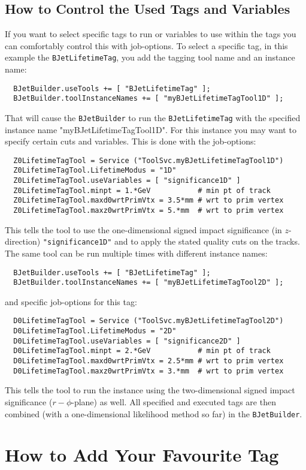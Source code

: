 \documentclass[a4paper,12pt]{article}
\begin{document}
\begin{appendix}
\subsection{How to Control the Used Tags and Variables}
If you want to select specific tags to run or variables to use within
the tags you can comfortably control this with job-options.
To select a specific tag, in this example the {\tt BJetLifetimeTag}, you 
add the tagging tool name and an instance name:
\begin{verbatim}
  BJetBuilder.useTools += [ "BJetLifetimeTag" ];
  BJetBuilder.toolInstanceNames += [ "myBJetLifetimeTagTool1D" ];
\end{verbatim}
That will cause the {\tt BJetBuilder} to run the {\tt BJetLifetimeTag} with
the specified instance name "myBJetLifetimeTagTool1D". For this instance you
may want to specify certain cuts and variables. This is done with the 
job-options:
\begin{verbatim}
  Z0LifetimeTagTool = Service ("ToolSvc.myBJetLifetimeTagTool1D")
  Z0LifetimeTagTool.LifetimeModus = "1D"
  Z0LifetimeTagTool.useVariables = [ "significance1D" ]
  Z0LifetimeTagTool.minpt = 1.*GeV           # min pt of track
  Z0LifetimeTagTool.maxd0wrtPrimVtx = 3.5*mm # wrt to prim vertex
  Z0LifetimeTagTool.maxz0wrtPrimVtx = 5.*mm  # wrt to prim vertex
\end{verbatim}
This tells the tool to use the one-dimensional signed impact significance
(in $z$-direction) {\tt "significance1D"} and to apply the stated quality cuts on the 
tracks. The same tool can be run multiple times with different instance names:
\begin{verbatim}
  BJetBuilder.useTools += [ "BJetLifetimeTag" ];
  BJetBuilder.toolInstanceNames += [ "myBJetLifetimeTagTool2D" ];
\end{verbatim}
and specific job-options for this tag:
\begin{verbatim}
  D0LifetimeTagTool = Service ("ToolSvc.myBJetLifetimeTagTool2D")
  D0LifetimeTagTool.LifetimeModus = "2D"
  D0LifetimeTagTool.useVariables = [ "significance2D" ]
  D0LifetimeTagTool.minpt = 2.*GeV           # min pt of track
  D0LifetimeTagTool.maxd0wrtPrimVtx = 2.5*mm # wrt to prim vertex
  D0LifetimeTagTool.maxz0wrtPrimVtx = 3.*mm  # wrt to prim vertex
\end{verbatim}
This tells the tool to run the instance using the two-dimensional signed
impact significance ($r-\phi$-plane) as well. All specified and executed 
tags are then combined (with a one-dimensional likelihood method so far) 
in the {\tt BJetBuilder}. 

\section{How to Add Your Favourite Tag}

\end{appendix}


\end{document}
